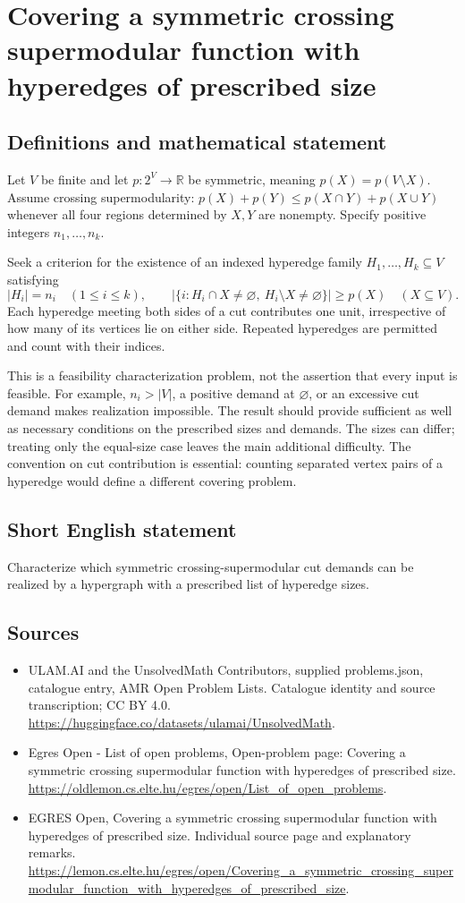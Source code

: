 \documentclass[11pt,a4paper]{article}
\begin{document}
\section*{Covering a symmetric crossing supermodular function with hyperedges of prescribed size}\label{statement}

\subsection{Definitions and mathematical statement}
Let $V$ be finite and let $p:2^V\to\mathbb R$ be symmetric,
meaning $p(X)=p(V\setminus X)$. Assume crossing supermodularity:
$p(X)+p(Y)\le p(X\cap Y)+p(X\cup Y)$ whenever all four regions
determined by $X,Y$ are nonempty.
Specify positive integers $n_1,\ldots,n_k$.

Seek a criterion for the existence of an indexed hyperedge family
$H_1,\ldots,H_k\subseteq V$ satisfying
\[
 |H_i|=n_i\quad(1\le i\le k),\qquad
 |\{i:H_i\cap X\ne\varnothing,\ H_i\setminus X\ne\varnothing\}|
                                      \ge p(X)\quad(X\subseteq V).
\]
Each hyperedge meeting both sides of a cut contributes one unit,
irrespective of how many of its vertices lie on either side. Repeated
hyperedges are permitted and count with their indices.

This is a feasibility characterization problem, not the assertion that
every input is feasible. For example, $n_i>|V|$, a positive demand at
$\varnothing$, or an excessive cut demand makes realization impossible.
The result should provide sufficient as well as necessary conditions
on the prescribed sizes and demands. The sizes can differ; treating
only the equal-size case leaves the main additional difficulty.
The convention on cut contribution is essential: counting separated
vertex pairs of a hyperedge would define a different covering problem.
\subsection{Short English statement}
Characterize which symmetric crossing-supermodular cut demands
can be realized by a hypergraph with a prescribed list of hyperedge sizes.
\subsection{Sources}
\begin{itemize}
\item[S1] ULAM.AI and the UnsolvedMath Contributors, supplied problems.json, catalogue entry, AMR Open Problem Lists. Catalogue identity and source transcription; CC BY 4.0.
\url{https://huggingface.co/datasets/ulamai/UnsolvedMath}.
\item[S2] Egres Open - List of open problems, Open-problem page: Covering a symmetric crossing supermodular function with hyperedges of prescribed size. 
\url{https://oldlemon.cs.elte.hu/egres/open/List_of_open_problems}.
\item[S3] EGRES Open, Covering a symmetric crossing supermodular function with hyperedges of prescribed size. Individual source page and explanatory remarks.
\url{https://lemon.cs.elte.hu/egres/open/Covering_a_symmetric_crossing_supermodular_function_with_hyperedges_of_prescribed_size}.
\end{itemize}
\end{document}
